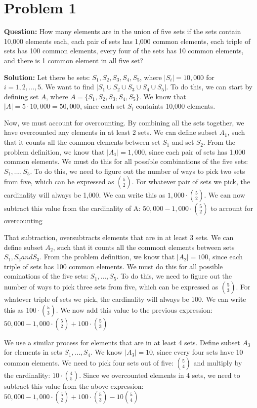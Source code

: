 \documentclass[11pt]{article}
\begin{document}
\section*{Problem 1}

\textbf{Question:}
How many elements are in the union of five sets if the sets contain 10,000 elements each, each pair of sets has 1,000 common elements, each triple of sets has 100 common elements, every four of the sets has 10 common elements, and there is 1 common element in all five set?

\textbf{Solution:}
Let there be sets: $S_1, S_2, S_3, S_4, S_5$, where $|S_i| = 10,000$ for $i = 1, 2, ..., 5$. We want to find $|S_1 \cup S_2 \cup S_3 \cup S_4 \cup S_5|$. To do this, we can start by defining set $A$, where $A = \{S_1, S_2, S_3, S_4, S_5\}$. We know that $|A| = 5 \cdot 10,000 = 50,000$, since each set $S_i$ containts 10,000 elements.

Now, we must account for overcounting. By combining all the sets together, we have overcounted any elements in at least 2 sets. We can define subset $A_1$, such that it counts all the common elements between set $S_1$ and set $S_2$. From the problem definition, we know that $|A_1| = 1,000$, since each pair of sets has 1,000 common elements. We must do this for all possible combinations of the five sets: $S_1, ..., S_5$. To do this, we need to figure out the number of ways to pick two sets from five, which can be expressed as $\binom{5}{2}$. For whatever pair of sets we pick, the cardinality will always be 1,000. We can write this as $1,000 \cdot \binom{5}{2}$. We can now subtract this value from the cardinality of A: $50,000 - 1,000 \cdot \binom{5}{2}$ to account for overcounting

That subtraction, oversubtracts elements that are in at least 3 sets. We can define subset $A_2$, such that it counts all the commont elements between sets $S_1, S_2 and S_3$. From the problem definition, we know that $|A_2| = 100$, since each triple of sets has 100 common elements. We must do this for all possible cominations of the five sets: $S_1, ..., S_5$. To do this, we need to figure out the number of ways to pick three sets from five, which can be expressed as $\binom{5}{3}$. For whatever triple of sets we pick, the cardinality will always be 100. We can write this as $100 \cdot \binom{5}{3}$. We now add this value to the previous expression: $50,000 - 1,000 \cdot \binom{5}{2} + 100 \cdot \binom{5}{3}$

We use a similar process for elements that are in at least 4 sets. Define subset $A_3$ for elements in sets $S_1, ..., S_4$. We know $|A_3|=10$, since every four sets have 10 common elements. We need to pick four sets out of five: $\binom{5}{4}$ and multiply by the cardinality: $10 \cdot \binom{4}{5}$. Since we overcounted elements in 4 sets, we need to subtract this value from the above expression: $50,000 - 1,000 \cdot \binom{5}{2} + 100 \cdot \binom{5}{3} - 10 \binom{5}{4}$
\end{document}
